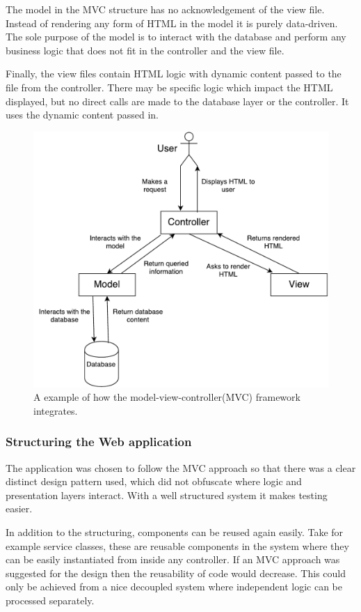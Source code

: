 The model in the MVC structure has no acknowledgement of the view file. Instead of rendering any form of HTML in the model it is purely data-driven. The sole purpose of the model is to interact with the database and perform any business logic that does not fit in the controller and the view file.

Finally, the view files contain HTML logic with dynamic content passed to the file from the controller. There may be specific logic which impact the HTML displayed, but no direct calls are made to the database layer or the controller. It uses the dynamic content passed in.
\begin{figure}[h]
  \centering
  \includegraphics[scale=0.5]{images/MVC}
  \caption{A example of how the model-view-controller(MVC) framework integrates.}
  \label{fig:mvc}
\end{figure}

\subsubsection{Structuring the Web application}
The application was chosen to follow the MVC approach so that there was a clear distinct design pattern used, which did not obfuscate where logic and presentation layers interact. With a well structured system it makes testing easier.

In addition to the structuring, components can be reused again easily. Take for example service classes, these are reusable components in the system where they can be easily instantiated from inside any controller. If an MVC approach was suggested for the design then the reusability of code would decrease. This could only be achieved from a nice decoupled system where independent logic can be processed separately.

